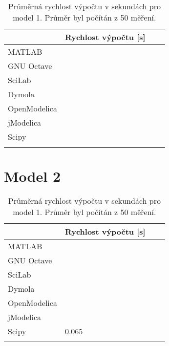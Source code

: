 \begin{table}[ht]
\centering
\begin{tabular}{|l|l|l|l|}
\hline
             & Rychlost výpočtu {[}s{]} &  &  \\ \hline
MATLAB       &                          &  &  \\ \hline
GNU Octave   &                          &  &  \\ \hline
SciLab       &                          &  &  \\ \hline
Dymola       &                          &  &  \\ \hline
OpenModelica &                          &  &  \\ \hline
jModelica    &                          &  &  \\ \hline
Scipy        &                          &  &  \\ \hline
             &                          &  &  \\ \hline
\end{tabular}
\caption{Průměrná rychlost výpočtu v sekundách pro model 1. Průměr byl počítán z 50 měření.}
\label{tab:micek-tabulka}
\end{table}

\section{Model 2}
\label{srovnani-kruh}


\begin{table}[ht]
\centering
\begin{tabular}{|l|l|l|l|}
\hline
             & Rychlost výpočtu {[}s{]} &  &  \\ \hline
MATLAB       &                          &  &  \\ \hline
GNU Octave   &                          &  &  \\ \hline
SciLab       &                          &  &  \\ \hline
Dymola       &                          &  &  \\ \hline
OpenModelica &                          &  &  \\ \hline
jModelica    &                          &  &  \\ \hline
Scipy        &       0.065              &  &  \\ \hline
             &                          &  &  \\ \hline
\end{tabular}
\caption{Průměrná rychlost výpočtu v sekundách pro model 1. Průměr byl počítán z 50 měření.}
\label{tab:kruh-tabulka}
\end{table}

